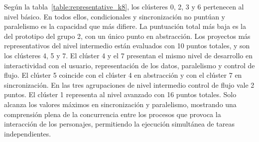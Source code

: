 \documentclass[a4paper, 12pt]{book}
\begin{document}
\begin{table}
    \centering
    \caption{Puntuaciones de los proyectos representativos para el clustering con k=8}
    \label{table:representative_k8}
\end{table}

Según la tabla~\ref{table:representative_k8}, los clústeres 0, 2, 3 y 6 pertenecen al nivel básico. En todos ellos, condicionales y sincronización no puntúan y paralelismo es la capacidad que más difiere. La puntuación total más baja es la del prototipo del grupo 2, con un único punto en abstracción. Los proyectos más representativos del nivel intermedio están evaluados con 10 puntos totales, y son los clústeres 4, 5 y 7. El clúster 4 y el 7 presentan el mismo nivel de desarrollo en interactividad con el usuario, representación de los datos, paralelismo y control de flujo. El clúster 5 coincide con el clúster 4 en abstracción y con el clúster 7 en sincronización. En las tres agrupaciones de nivel intermedio control de flujo vale 2 puntos. El clúster 1 representa al nivel avanzado con 16 puntos totales. Solo alcanza los valores máximos en sincronización y paralelismo, mostrando una comprensión plena de la concurrencia entre los procesos que provoca la interacción de los personajes, permitiendo la ejecución simultánea de tareas independientes.
\end{document}
